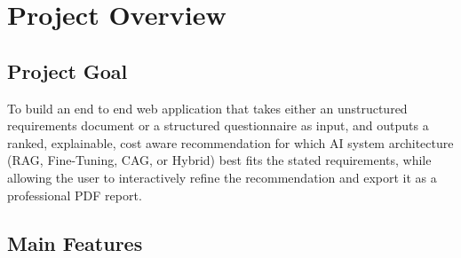 \documentclass[11pt,a4paper]{report}
\begin{document}
\chapter{Project Overview}

\section{Project Goal}

To build an end to end web application that takes either an unstructured requirements document or a structured questionnaire as input, and outputs a ranked, explainable, cost aware recommendation for which AI system architecture (RAG, Fine-Tuning, CAG, or Hybrid) best fits the stated requirements, while allowing the user to interactively refine the recommendation and export it as a professional PDF report.

\section{Main Features}
\end{document}
